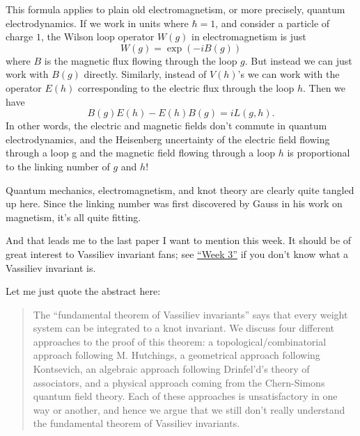 \documentclass{article}
\def\tightlist{}
\renewcommand{\texttt}[1]{%
  \begingroup
  \ttfamily
  \begingroup\lccode`~=`/\lowercase{\endgroup\def~}{/\discretionary{}{}{}}%
  \begingroup\lccode`~=`[\lowercase{\endgroup\def~}{[\discretionary{}{}{}}%
  \begingroup\lccode`~=`.\lowercase{\endgroup\def~}{.\discretionary{}{}{}}%
  \catcode`/=\active\catcode`[=\active\catcode`.=\active
  \scantokens{#1\noexpand}%
  \endgroup
}
\begin{document}
This formula applies to plain old electromagnetism, or more precisely,
quantum electrodynamics. If we work in units where \(\hbar = 1\), and
consider a particle of charge \(1\), the Wilson loop operator \(W(g)\)
in electromagnetism is just \[W(g) = \exp(-iB(g))\] where \(B\) is the
magnetic flux flowing through the loop \(g\). But instead we can just
work with \(B(g)\) directly. Similarly, instead of \(V(h)\)'s we can
work with the operator \(E(h)\) corresponding to the electric flux
through the loop \(h\). Then we have
\[B(g) E(h) - E(h) B(g) = i L(g,h).\] In other words, the electric and
magnetic fields don't commute in quantum electrodynamics, and the
Heisenberg uncertainty of the electric field flowing through a loop g
and the magnetic field flowing through a loop \(h\) is proportional to
the linking number of \(g\) and \(h\)!

Quantum mechanics, electromagnetism, and knot theory are clearly quite
tangled up here. Since the linking number was first discovered by Gauss
in his work on magnetism, it's all quite fitting.

And that leads me to the last paper I want to mention this week. It
should be of great interest to Vassiliev invariant fans; see
\protect\hyperlink{week3}{``Week 3''} if you don't know what a Vassiliev
invariant is.


Let me just quote the abstract here:

\begin{quote}
The ``fundamental theorem of Vassiliev invariants'' says that every
weight system can be integrated to a knot invariant. We discuss four
different approaches to the proof of this theorem: a
topological/combinatorial approach following M. Hutchings, a geometrical
approach following Kontsevich, an algebraic approach following
Drinfel'd's theory of associators, and a physical approach coming from
the Chern-Simons quantum field theory. Each of these approaches is
unsatisfactory in one way or another, and hence we argue that we still
don't really understand the fundamental theorem of Vassiliev invariants.
\end{quote}
\end{document}
